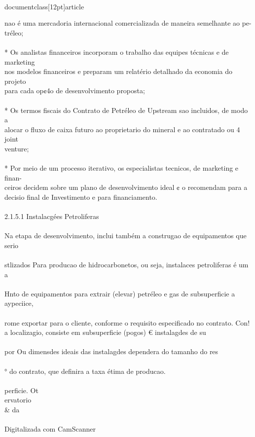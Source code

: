 \\documentclass[12pt]{article}
\begin{document}
nao é uma mercadoria internacional comercializada de maneira semelhante ao pe-\\
tréleo;\\
\\
* Os analistas financeiros incorporam o trabalho das equipes técnicas e de marketing\\
nos modelos financeiros e preparam um relatério detalhado da economia do projeto\\
para cada op¢4o de desenvolvimento proposta;\\
\\
* Os termos fiscais do Contrato de Petréleo de Upstream sao incluidos, de modo a\\
alocar o fluxo de caixa futuro ao proprietario do mineral e ao contratado ou 4 joint\\
venture;\\
\\
* Por meio de um processo iterativo, os especialistas tecnicos, de marketing e finan-\\
ceiros decidem sobre um plano de desenvolvimento ideal ¢ o recomendam para a\\
decisio final de Investimento e para financiamento.\\
\\
2.1.5.1 Instalacgées Petroliferas\\
\\
Na etapa de desenvolvimento, inclui também a construgao de equipamentos que serio\\
\\
stlizados Para producao de hidrocarbonetos, ou seja, instalaces petroliferas é um a\\
\\
Hnto de equipamentos para extrair (elevar) petréleo e gas de subsuperficie a aypeciice,\\
\\
rome exportar para o cliente, conforme o requisito especificado no contrato. Con!\\
a localizagio, consiste em subsuperficie (pogos) € instalagdes de su\\
\\
por Ou dimensdes ideais das instalagdes dependera do tamanho do res\\
\\
° do contrato, que definira a taxa étima de producao.\\
\\
perficie. Ot\\
ervatorio \\& da\\
\\
Digitalizada com CamScanner\\
\end{document}
